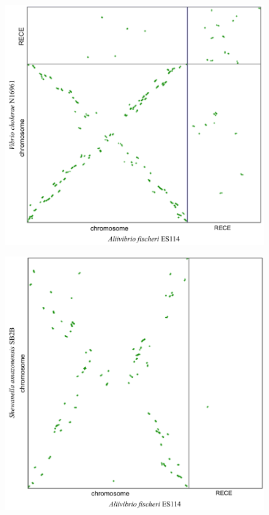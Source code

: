 \begin{figure}[H]
\begin{center}
\hspace{-3cm}
	\begin{minipage}{0.5\textwidth}
   		\includegraphics[width=\textwidth]{./img/synteny/new/fig8_12a.png}
   		\label{figsyntvib1}
	\end{minipage}
  	\begin{minipage}{0.5\textwidth}
  		\hspace{1cm}
   		\includegraphics[width=1.1\textwidth]{./img/synteny/new/fig8_12b.png}

\end{minipage}
\end{center}
\end{figure}
